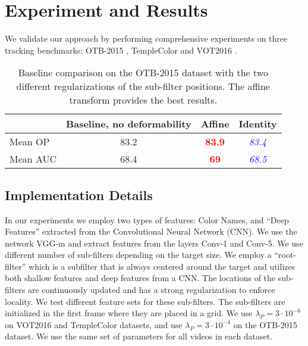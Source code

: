 \documentclass[runningheads,a4paper]{llncs}
\begin{document}
\section{Experiment and Results}
We validate our approach by performing comprehensive experiments on three tracking benchmarks: OTB-2015 \cite{OTB2015}, TempleColor \cite{TempleColor} and VOT2016 \cite{VOT2016}.

\begin{table}[!t]
  \caption{Baseline comparison on the OTB-2015 dataset with the two different regularizations of the sub-filter positions. The affine transform provides the best results.}
  \label{table:baselinetransf}
  \centering
    \begin{tabular}{|l||c|c|c|}
      \hline
      &Baseline, no deformability&Affine &Identity\\\hline\hline
      Mean OP&83.2&\textbf{\textcolor{red}{83.9}}&\textit{\textcolor{blue}{83.4}}\\\hline
      Mean AUC&68.4&\textbf{\textcolor{red}{69}}&\textit{\textcolor{blue}{68.5}}\\\hline
    \end{tabular}
    \vspace{-0.0cm}
\end{table}\begin{table}[!t]
  \caption{Baseline comparison on the OTB-2015 dataset when using different set of features for the sub-filters.}
  \label{table:baselinefeat}
\end{table}\subsection{Implementation Details}
In our experiments we employ two types of features: Color Names, and ``Deep Features'' extracted from the Convolutional Neural Network (CNN). We use the network VGG-m and extract features from the layers Conv-1 and Conv-5. We use different number of sub-filters depending on the target size. We employ a ``root-filter'' which is a subfilter that is always centered around the target and utilizes both shallow features and deep features from a CNN. The locations of the sub-filters are continuously updated and has a strong regularization to enforce locality. We test different feature sets for these sub-filters. The sub-filters are initialized in the first frame where they are placed in a grid. We use $\lambda_P = 3\cdot 10^{-6}$ on VOT2016 and TempleColor datasets, and use $\lambda_P = 3\cdot10^{-4}$ on the OTB-2015 dataset. We use the same set of parameters for all videos in each dataset.
\end{document}
